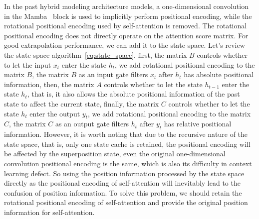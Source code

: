\documentclass{article}
\theoremstyle{plain}
\theoremstyle{definition}
\theoremstyle{remark}
\begin{document}
In the past hybrid modeling architecture models, a one-dimensional convolution in the Mamba~\cite{gu2023mamba} block is used to implicitly perform positional encoding, while the rotational positional encoding used by self-attention is removed. The rotational positional encoding does not directly operate on the attention score matrix. For good extrapolation performance, we can add it to the state space. Let's review the state-space algorithm~\ref{eq:state_space}, first, the matrix $B$ controls whether to let the input $x_t$ enter the state $h_t$, we add rotational positional encoding to the matrix $B$, the matrix $B$ as an input gate filters $x_t$ after $h_t$ has absolute positional information, then, the matrix $A$ controls whether to let the state $h_{t-1}$ enter the state $h_t$, that is, it also allows the absolute positional information of the past state to affect the current state, finally, the matrix $C$ controls whether to let the state $h_t$ enter the output $y_t$, we add rotational positional encoding to the matrix $C$, the matrix $C$ as an output gate filters $h_t$ after $y_t$ has relative positional information. However, it is worth noting that due to the recursive nature of the state space, that is, only one state cache is retained, the positional encoding will be affected by the superposition state, even the original one-dimensional convolution positional encoding is the same, which is also its difficulty in context learning defect. So using the position information processed by the state space directly as the positional encoding of self-attention will inevitably lead to the confusion of position information. To solve this problem, we should retain the rotational positional encoding of self-attention and provide the original position information for self-attention.
\end{document}

